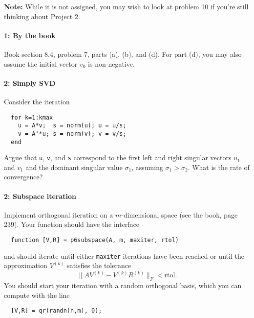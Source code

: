 \documentclass[12pt, leqno]{article}
\begin{document}

{\bf Note:} While it is not assigned, you may wish to look at problem
10 if you're still thinking about Project 2.

\paragraph*{1: By the book}
Book section 8.4, problem 7, parts (a), (b), and (d).  For part (d),
you may also assume the initial vector $v_0$ is non-negative.

\paragraph*{2: Simply SVD}
Consider the iteration
\begin{lstlisting}
  for k=1:kmax
    u = A*v;  s = norm(u); u = u/s;
    v = A'*u; s = norm(v); v = v/s;
  end
\end{lstlisting}
Argue that {\tt u}, {\tt v}, and {\tt s} correspond to the first left
and right singular vectors $u_1$ and $v_1$ and the dominant singular
value $\sigma_1$, assuming $\sigma_1 > \sigma_2$.  What is the rate
of convergence?

\paragraph*{2: Subspace iteration}
Implement orthogonal iteration on a $m$-dimensional space
(see the book, page 239).  Your function should have the interface
\begin{lstlisting}
  function [V,R] = p6subspace(A, m, maxiter, rtol)
\end{lstlisting}
and should iterate until either {\tt maxiter} iterations have been
reached or until the approximation $V^{(k)}$ satisfies the tolerance
\[
  \|A V^{(k)} - V^{(k)} R^{(k)}\|_F < \mbox{rtol}.
\]
You should start your iteration with a random orthogonal basis, which
you can compute with the line
\begin{lstlisting}
  [V,R] = qr(randn(n,m), 0);
\end{lstlisting}
\end{document}
